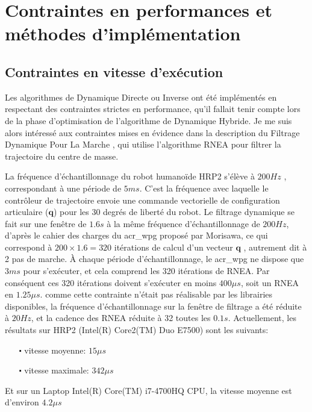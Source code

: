 \documentclass{report}
\begin{document}
\section{Contraintes en performances et méthodes d'implémentation} \label{ch_concepts_implEtContr}

\subsection{Contraintes en vitesse d'exécution}

Les algorithmes de Dynamique Directe ou Inverse ont été implémentés en respectant des contraintes strictes en performance, qu'il fallait tenir compte lors de la phase d'optimisation de l'algorithme de Dynamique Hybride. Je me suis alors intéressé aux contraintes mises en évidence dans la description du Filtrage Dynamique Pour La Marche \cite{bib_filtrageTrajectoireCoM}, qui utilise l'algorithme RNEA pour filtrer la trajectoire du centre de masse.

La fréquence d'échantillonnage du robot humanoïde HRP2 s'élève à $200 Hz$ , correspondant à une période de $5 ms$. C'est la fréquence avec laquelle le contrôleur de trajectoire envoie une commande vectorielle de configuration articulaire ($\mathbf{q}$) pour les 30 degrés de liberté du robot. Le filtrage dynamique se fait sur une fenêtre de $1.6 s$ à la même fréquence d'échantillonnage de $200 Hz$, d'après le cahier des charges du \gls{acr_wpg} proposé par Morisawa, ce qui correspond à $200 \times 1.6 = 320$ itérations de calcul d'un vecteur $\mathbf{q}$ \cite[I.B et III.B]{bib_filtrageTrajectoireCoM}, autrement dit à 2 pas de marche. \`{A} chaque période d'échantillonnage, le \gls{acr_wpg} ne dispose que $3 ms$ pour s'exécuter, et cela comprend les 320 itérations de RNEA. Par conséquent ces 320 itérations doivent s'exécuter en moins $400 \mu s$, soit un RNEA en $1.25 \mu s$. comme cette contrainte n'était pas réalisable par les librairies disponibles, la fréquence d'échantillonnage sur la fenêtre de filtrage a été réduite à $20 Hz$, et la cadence des RNEA réduite à 32 toutes les $0.1 s$. Actuellement, les résultats sur HRP2 (Intel(R) Core2(TM) Duo E7500) sont les suivants:
\begin{itemize}
\item[$\centerdot$ vitesse moyenne:] $15 \mu s$
\item[$\centerdot$ vitesse maximale:] $342 \mu s$
\end{itemize}
Et sur un Laptop Intel(R) Core(TM) i7-4700HQ CPU, la vitesse moyenne est d'environ $4.2 \mu s$
\end{document}
